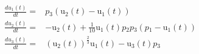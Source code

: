\begin{align}
\frac{du{_1}(t)}{dt} =& p{_3} \left( \mathrm{u{_2}}\left( t \right) - \mathrm{u{_1}}\left( t \right) \right) \\
\frac{du{_2}(t)}{dt} =&  - \mathrm{u{_2}}\left( t \right) + \frac{1}{10} \mathrm{u{_1}}\left( t \right) p{_2} p{_3} \left( p{_1} - \mathrm{u{_1}}\left( t \right) \right) \\
\frac{du{_3}(t)}{dt} =& \left( \mathrm{u{_2}}\left( t \right) \right)^{\frac{2}{3}} \mathrm{u{_1}}\left( t \right) - \mathrm{u{_3}}\left( t \right) p{_3}
\end{align}
